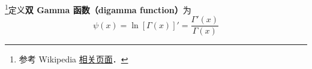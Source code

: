 
\begin{issues}
\issueDraft
\end{issues}


\footnote{参考 Wikipedia \href{https://en.wikipedia.org/wiki/Digamma_function}{相关页面}．}定义\textbf{双 Gamma 函数（digamma function）}为
\begin{equation}
\psi(x) = \ln[\Gamma(x)]' = \frac{\Gamma'(x)}{\Gamma(x)}
\end{equation}
